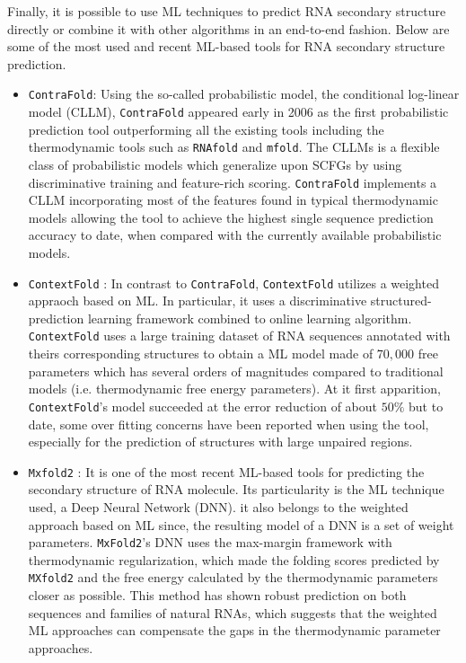 Finally, it is possible to use ML techniques to predict RNA secondary structure directly or combine it with other algorithms in an end-to-end fashion. Below are some of the most used and recent ML-based tools for RNA secondary structure prediction.
\begin{itemize}
	\item \texttt{ContraFold}\cite{do2006contrafold}: Using the so-called probabilistic model, the conditional log-linear model (CLLM), \texttt{ContraFold} appeared early in 2006 as the first  probabilistic prediction tool outperforming all the existing tools including the thermodynamic tools such as \texttt{RNAfold} and \texttt{mfold}. The CLLMs is a flexible class of probabilistic models which generalize upon SCFGs by using discriminative training and feature-rich scoring. \texttt{ContraFold} implements a CLLM incorporating most of the features found in typical thermodynamic models allowing the tool to achieve the highest single sequence prediction accuracy to date, when compared with the currently available probabilistic models.
	\item \texttt{ContextFold} \cite{zakov2011rich}: In contrast to \texttt{ContraFold}, \texttt{ContextFold} utilizes a weighted appraoch based on ML. In particular, it uses a discriminative structured-prediction learning framework combined to online learning algorithm. \texttt{ContextFold} uses a large training dataset of RNA sequences annotated with theirs corresponding structures to obtain a ML model made of $70,000$ free parameters which has several orders of magnitudes compared to traditional models (i.e. thermodynamic free energy parameters). At it first apparition, \texttt{ContextFold}'s model succeeded at the error reduction of about $50\%$ but to date, some over fitting concerns have been reported when using the tool, especially for the prediction of structures with large unpaired regions.  
	\item \texttt{Mxfold2}  \cite{sato2021rna}: It is one of the most recent ML-based tools for predicting the secondary structure of RNA molecule. Its particularity is the ML technique used, a Deep Neural Network (DNN). it also belongs to the weighted approach based on ML since, the resulting model of a DNN is a set of weight parameters. \texttt{MxFold2}'s DNN uses the max-margin framework with thermodynamic regularization, which made the folding scores predicted by \texttt{MXfold2} and the free energy calculated by the thermodynamic parameters closer as possible. This method has shown robust prediction on both sequences and families of natural RNAs, which suggests that the weighted ML approaches can compensate the gaps in the thermodynamic parameter approaches. 
\end{itemize}

